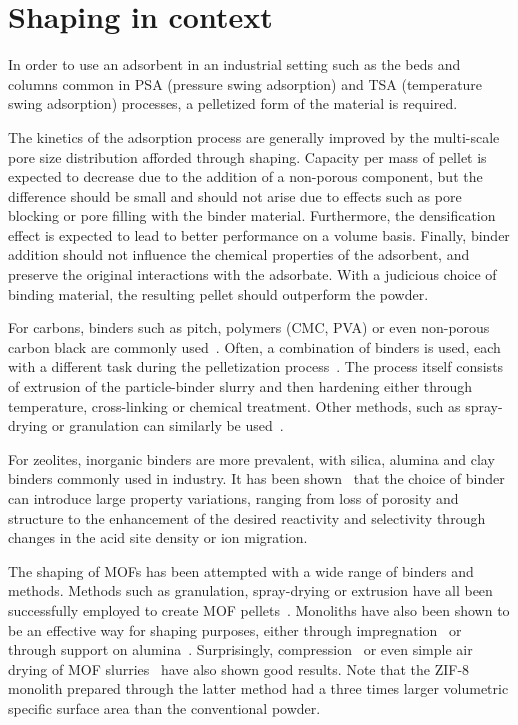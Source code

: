 
\section{Shaping in context}

In order to use an adsorbent in an industrial setting such as the beds and
columns common in PSA (pressure swing adsorption) and TSA (temperature swing adsorption)
processes, a pelletized form of the material is required.\cite{akhtarStructuringAdsorbentsCatalysts2014} 

The kinetics of the adsorption process are generally improved by the multi-scale
pore size distribution afforded through shaping. 
Capacity per mass of pellet is expected to decrease due to the
addition of a non-porous component, but the difference should be small and should not arise 
due to effects such as pore blocking or pore filling with the binder material. 
Furthermore, the densification effect is expected to lead to better performance on a volume basis.
Finally, binder addition should not influence the chemical properties of the adsorbent,
and preserve the original interactions with the adsorbate.
With a judicious choice of binding material, the resulting pellet 
should outperform the powder.


For carbons, binders such as pitch, polymers (CMC, PVA) or even non-porous carbon black 
are commonly used~\cite{ohjiAdvancedProcessingManufacturing2008}. 
Often, a combination of binders is used, each with a different task during the
pelletization process~\cite{bandoszActivatedCarbonSurfaces2006}. 
The process itself consists of extrusion of the 
particle-binder slurry and then hardening either through temperature, cross-linking 
or chemical treatment. Other methods, such as spray-drying or granulation can similarly
be used~\cite{ruthvenPrinciplesAdsorptionAdsorption1984}. 

For zeolites, inorganic binders are more prevalent, with silica, alumina and clay binders
commonly used in industry. It has been shown~\cite{whitingcuriouscasezeolite2016, 
MichelsEffectsBindersPerformance2014}
that the choice of binder can introduce large property variations, ranging from
loss of porosity and structure to the enhancement of the desired reactivity and selectivity
through changes in the acid site density or ion migration.

The shaping of MOFs has been attempted with a wide range of binders and methods.
Methods such as granulation, spray-drying or extrusion have all
been successfully employed to create MOF 
pellets~\cite{kaskelChemistryMetalorganicFrameworks2016}.
Monoliths have also been shown to be an effective way for shaping purposes, 
either through impregnation~\cite{ramos-fernandezMOFsMeetMonoliths2011} or through
support on alumina~\cite{aguadoFacileShapingImidazolatebased2010}.
Surprisingly, compression~\cite{bazer-bachiIndustrialUseMetalorganic2014} or even 
simple air drying of MOF slurries~\cite{tianMechanicallyChemicallyRobust2015}
have also shown good results. Note that the ZIF-8 monolith prepared through the 
latter method had a three times larger volumetric specific surface area than
the conventional powder.


